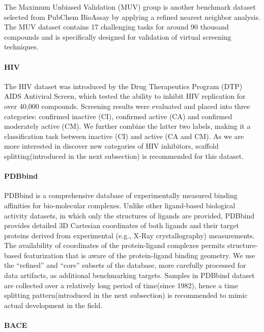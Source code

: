 The Maximum Unbiased Validation (MUV) group is another benchmark dataset selected from PubChem BioAssay by applying a refined nearest neighbor analysis.\cite{muv_dataset} The MUV dataset contains 17 challenging tasks for around 90 thousand compounds and is specifically designed for validation of virtual screening techniques.

\paragraph{HIV}

The HIV dataset was introduced by the Drug Therapeutics Program (DTP) AIDS Antiviral Screen, which tested the ability to inhibit HIV replication for over 40,000 compounds.\cite{HIV} Screening results were evaluated and placed into three categories: confirmed inactive (CI), confirmed active (CA) and confirmed moderately active (CM). We further combine the latter two labels, making it a classification task between inactive (CI) and active (CA and CM). As we are more interested in discover new categories of HIV inhibitors, scaffold splitting(introduced in the next subsection) is recommended for this dataset.

\paragraph{PDBbind}

PDBbind is a comprehensive database of experimentally measured binding affinities for bio-molecular complexes.\cite{PDBbind1, PDBbind2} Unlike other ligand-based biological activity datasets, in which only the structures of ligands are provided, PDBbind provides detailed 3D Cartesian coordinates of both ligands and their target proteins derived from experimental (e.g., X-Ray crystallography) measurements. The availability of coordinates of the protein-ligand complexes permits structure-based featurization that is aware of the protein-ligand binding geometry. We use the ``refined'' and ``core'' subsets of the database\cite{PDBbind3}, more carefully processed for data artifacts, as additional benchmarking targets. Samples in PDBbind dataset are collected over a relatively long period of time(since 1982), hence a time splitting pattern(introduced in the next subsection) is recommended to mimic actual development in the field.

\paragraph{BACE}


